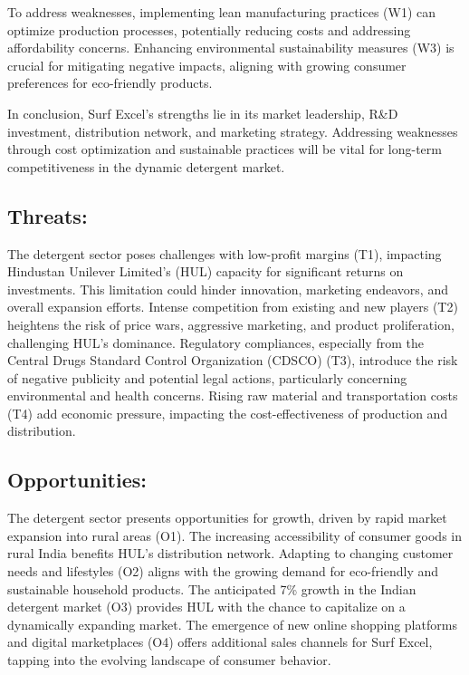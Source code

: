 To address weaknesses, implementing lean manufacturing practices (W1) can optimize production processes, potentially reducing costs and addressing affordability concerns. Enhancing environmental sustainability measures (W3) is crucial for mitigating negative impacts, aligning with growing consumer preferences for eco-friendly products.

In conclusion, Surf Excel's strengths lie in its market leadership, R\&D investment, distribution network, and marketing strategy. Addressing weaknesses through cost optimization and sustainable practices will be vital for long-term competitiveness in the dynamic detergent market.


\subsection{Threats:}

The detergent sector poses challenges with low-profit margins (T1), impacting Hindustan Unilever Limited's (HUL) capacity for significant returns on investments. This limitation could hinder innovation, marketing endeavors, and overall expansion efforts. Intense competition from existing and new players (T2) heightens the risk of price wars, aggressive marketing, and product proliferation, challenging HUL's dominance. Regulatory compliances, especially from the Central Drugs Standard Control Organization (CDSCO) (T3), introduce the risk of negative publicity and potential legal actions, particularly concerning environmental and health concerns. Rising raw material and transportation costs (T4) add economic pressure, impacting the cost-effectiveness of production and distribution.

\subsection{Opportunities:}

The detergent sector presents opportunities for growth, driven by rapid market expansion into rural areas (O1). The increasing accessibility of consumer goods in rural India benefits HUL's distribution network. Adapting to changing customer needs and lifestyles (O2) aligns with the growing demand for eco-friendly and sustainable household products. The anticipated 7\% growth in the Indian detergent market (O3) provides HUL with the chance to capitalize on a dynamically expanding market. The emergence of new online shopping platforms and digital marketplaces (O4) offers additional sales channels for Surf Excel, tapping into the evolving landscape of consumer behavior.

